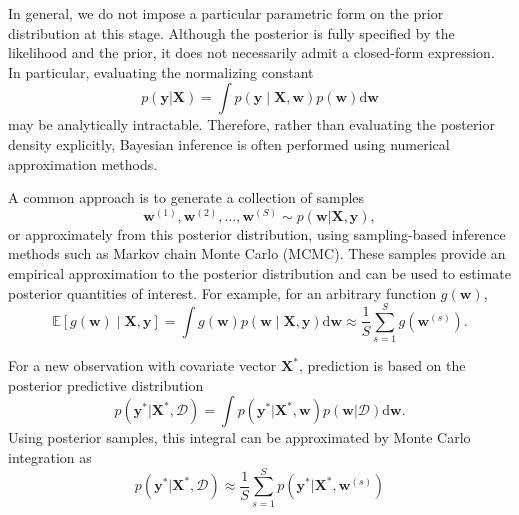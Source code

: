 \documentclass[../Bayesian_Inference.tex]{subfiles}
\begin{document}
In  general, we do not impose a particular parametric form on the prior distribution at this stage. Although the posterior is fully specified by the likelihood and the prior, it does not necessarily admit a closed-form expression. In particular, evaluating the normalizing constant
\[
    p(\bm{y} | \mathbf{X}) = \int p(\bm{y}\mid\mathbf{X},\bm{w})p(\bm{w}) \mathrm{d} \bm{w}
\]
may be analytically intractable. Therefore, rather than evaluating the posterior density explicitly, Bayesian inference is often performed using numerical approximation methods.

A common approach is to generate a collection of samples
\[
    \bm{w}^{(1)},\bm{w}^{(2)},\ldots,\bm{w}^{(S)} \sim p(\bm{w} | \mathbf{X},\bm{y}),
\]
or approximately from this posterior distribution, using sampling-based inference methods such as Markov chain Monte Carlo (MCMC). These samples provide an empirical approximation to the posterior distribution and can be used to estimate posterior quantities of interest. For example, for an arbitrary function $g(\bm{w})$,
\[
\mathbb E[g(\bm w)\mid\mathbf X,\bm y]
=
\int
g(\bm w)
p(\bm w\mid\mathbf X,\bm y)
\mathrm d\bm w
\approx
\frac{1}{S}
\sum_{s=1}^{S}
g\left(\bm w^{(s)}\right).
\]

For a new observation with covariate vector $\mathbf{X}^{*}$, prediction is based on the posterior predictive distribution 
\[
    p(\bm{y}^* | \mathbf{X}^{*}, \mathcal{D}) = \int p(\bm{y}^* | \mathbf{X}^{*}, \bm{w}) p(\bm{w} | \mathcal{D}) \mathrm{d} \bm{w}.
\]
Using posterior samples, this integral can be approximated by Monte Carlo integration as
\[
    p(\bm{y}^* | \mathbf{X}^{*}, \mathcal{D}) \approx \frac{1}{S} \sum_{s =1}^{S} p\left(\bm{y}^* | \mathbf{X}^{*}, \bm w^{(s)}\right)
\]
\end{document}
